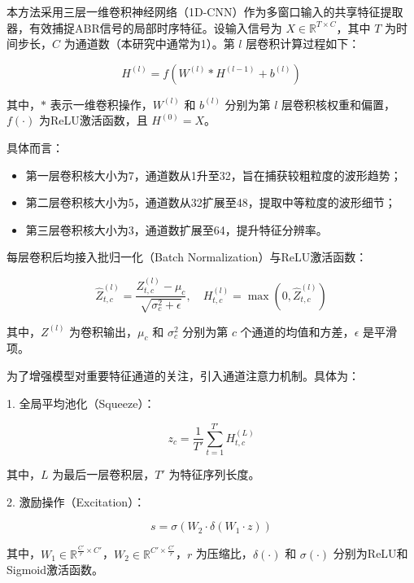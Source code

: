 本方法采用三层一维卷积神经网络（1D-CNN）作为多窗口输入的共享特征提取器，有效捕捉ABR信号的局部时序特征。设输入信号为 \(X \in \mathbb{R}^{T \times C}\)，其中 \(T\) 为时间步长，\(C\) 为通道数（本研究中通常为1）。第 \(l\) 层卷积计算过程如下：

\begin{equation}
H^{(l)} = f\left( W^{(l)} * H^{(l-1)} + b^{(l)} \right)
\end{equation}

其中，\( * \) 表示一维卷积操作，\(W^{(l)}\) 和 \(b^{(l)}\) 分别为第 \(l\) 层卷积核权重和偏置，\(f(\cdot)\) 为ReLU激活函数，且 \(H^{(0)} = X\)。

具体而言：

\begin{itemize}
    \item 第一层卷积核大小为7，通道数从1升至32，旨在捕获较粗粒度的波形趋势；
    \item 第二层卷积核大小为5，通道数从32扩展至48，提取中等粒度的波形细节；
    \item 第三层卷积核大小为3，通道数扩展至64，提升特征分辨率。
\end{itemize}

每层卷积后均接入批归一化（Batch Normalization）与ReLU激活函数：

\begin{equation}
\hat{Z}^{(l)}_{t,c} = \frac{Z^{(l)}_{t,c} - \mu_c}{\sqrt{\sigma_c^2 + \epsilon}}, \quad
H^{(l)}_{t,c} = \max(0, \hat{Z}^{(l)}_{t,c})
\end{equation}

其中，\(Z^{(l)}\) 为卷积输出，\(\mu_c\) 和 \(\sigma_c^2\) 分别为第 \(c\) 个通道的均值和方差，\(\epsilon\) 是平滑项。

为了增强模型对重要特征通道的关注，引入通道注意力机制。具体为：

1. 全局平均池化（Squeeze）：

\begin{equation}
z_c = \frac{1}{T'} \sum_{t=1}^{T'} H^{(L)}_{t,c}
\end{equation}

其中，\(L\) 为最后一层卷积层，\(T'\) 为特征序列长度。

2. 激励操作（Excitation）：

\begin{equation}
s = \sigma \left( W_2 \cdot \delta \left( W_1 \cdot z \right) \right)
\end{equation}

其中，\(W_1 \in \mathbb{R}^{\frac{C'}{r} \times C'}\)，\(W_2 \in \mathbb{R}^{C' \times \frac{C'}{r}}\)，\(r\) 为压缩比，\(\delta(\cdot)\) 和 \(\sigma(\cdot)\) 分别为ReLU和Sigmoid激活函数。

